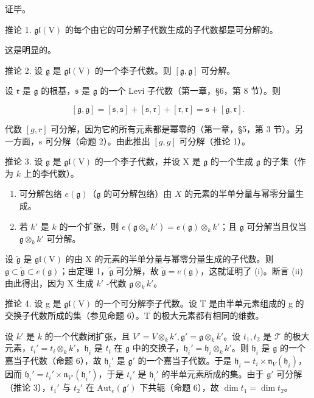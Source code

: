 证毕。

推论 1. \(\mathfrak{gl}(\mathrm{V})\) 的每个由它的可分解子代数生成的子代数都是可分解的。

这是明显的。

推论 2. 设 \(\mathfrak{g}\) 是 \(\mathfrak{gl}(\mathrm{V})\) 的一个李子代数。则 \([\mathfrak{g},\mathfrak{g}]\) 可分解。

设 \(\mathfrak{r}\) 是 \(\mathfrak{g}\) 的根基，\(\mathfrak{s}\) 是 \(\mathfrak{g}\) 的一个 Levi 子代数（第一章，§6，第 8 节）。则

\[
[ \mathfrak {g}, \mathfrak {g} ] = [ \mathfrak {s}, \mathfrak {s} ] + [ \mathfrak {s}, \mathfrak {r} ] + [ \mathfrak {r}, \mathfrak {r} ] = \mathfrak {s} + [ \mathfrak {g}, \mathfrak {r} ].
\]

代数 \([g,r]\) 可分解，因为它的所有元素都是幂零的（第一章，§5，第 3 节）。另一方面，s 可分解（命题 2）。由此推出 \([g,g]\) 可分解（推论 1）。

推论 3. 设 \(\mathfrak{g}\) 是 \(\mathfrak{gl}(\mathrm{V})\) 的一个李子代数，并设 \(\mathrm{X}\) 是 \(\mathfrak{g}\) 的一个生成 \(\mathfrak{g}\) 的子集（作为 \(k\) 上的李代数）。

\begin{enumerate}
\def\labelenumi{(\roman{enumi})}
\item
  可分解包络 \(e(\mathfrak{g})\)（\(\mathfrak{g}\) 的可分解包络）由 \(X\) 的元素的半单分量与幂零分量生成。
\item
  若 \(k'\) 是 \(k\) 的一个扩张，则 \(e(\mathfrak{g} \otimes_k k') = e(\mathfrak{g}) \otimes_k k'\)；且 \(\mathfrak{g}\) 可分解当且仅当 \(\mathfrak{g} \otimes_k k'\) 可分解。
\end{enumerate}

设 \(\tilde{\mathfrak{g}}\) 是 \(\mathfrak{gl}(\mathrm{V})\) 的由 X 的元素的半单分量与幂零分量生成的子代数。则 \(\mathfrak{g} \subset \tilde{\mathfrak{g}} \subset e(\mathfrak{g})\)；由定理 1，\(\tilde{\mathfrak{g}}\) 可分解，故 \(\tilde{\mathfrak{g}} = e(\mathfrak{g})\)，这就证明了 (i)。断言 (ii) 由此得出，因为 X 生成 \(k'\) -代数 \(\mathfrak{g} \otimes_k k'\)。

推论 4. 设 g 是 \(\mathfrak{gl}(\mathrm{V})\) 的一个可分解李子代数。设 T 是由半单元素组成的 g 的交换子代数所成的集（参见命题 6）。T 的极大元素都有相同的维数。

设 \(k'\) 是 \(k\) 的一个代数闭扩张，且 \(V' = V \otimes_k k', \mathfrak{g}' = \mathfrak{g} \otimes_k k'\)。设 \(t_1, t_2\) 是 \(\mathcal{T}\) 的极大元素，\(t_i' = t_i \otimes_k k'\)，\(\mathfrak{h}_i\) 是 \(t_i\) 在 \(\mathfrak{g}\) 中的交换子，\(\mathfrak{h}_i' = \mathfrak{h}_i \otimes_k k'\)。则 \(\mathfrak{h}_i\) 是 \(\mathfrak{g}\) 的一个嘉当子代数（命题 6），故 \(\mathfrak{h}_i'\) 是 \(\mathfrak{g}'\) 的一个嘉当子代数。于是 \(\mathfrak{h}_i = t_i \times \mathfrak{n}_V(\mathfrak{h}_i)\)，因而 \(\mathfrak{h}_i' = t_i' \times \mathfrak{n}_{V'}(\mathfrak{h}_i')\)，于是 \(t_i'\) 是 \(\mathfrak{h}_i'\) 的半单元素所成的集。由于 \(\mathfrak{g}'\) 可分解（推论 3），\(t_1'\) 与 \(t_2'\) 在 \(\text{Aut}_e(\mathfrak{g}')\) 下共轭（命题 6），故 \(\dim t_1 = \dim t_2\)。

